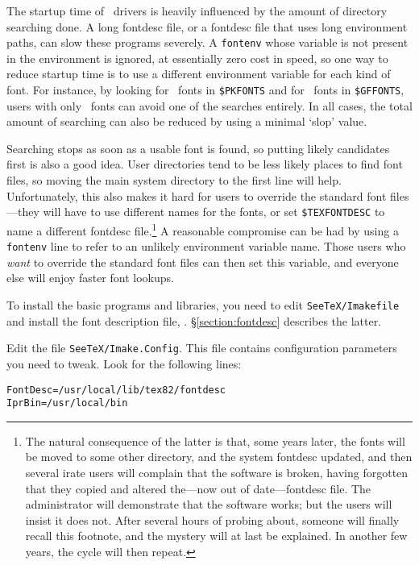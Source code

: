 The startup time of \mctex\ drivers
is heavily influenced by the amount of directory searching done.
A long fontdesc file,
or a fontdesc file that uses long environment paths,
can slow these programs severely.
A {\tt fontenv} whose variable is not present in the environment
is ignored,
at essentially zero cost in speed,
so one way to reduce startup time
is to use a different environment variable for each kind of font.
For instance,
by looking for \pk\ fonts in {\tt\$PKFONTS}
and for \gf\ fonts in {\tt\$GFFONTS},
users with only \gf\ fonts can avoid one of the searches entirely.
In all cases,
the total amount of searching
can also be reduced by using a minimal `slop' value.

Searching stops as soon as a usable font is found,
so putting likely candidates first is also a good idea.
User directories tend to be less likely places to find font files,
so moving the main system directory to the first line will help.
Unfortunately,
this also makes it hard
for users to override the standard font files---they
will have to use different names for the fonts,
or set {\tt\$TEXFONTDESC} to name a different fontdesc file.\footnote
{The natural consequence of the latter is that,
some years later,
the fonts will be moved to some other directory,
and the system fontdesc updated,
and then several irate users will complain that the software is broken,
having forgotten that they copied and altered
the---now out of date---fontdesc file.
The administrator will demonstrate that the software works;
but the users will insist it does not.
After several hours of probing about,
someone will finally recall this footnote,
and the mystery will at last be explained.
In another few years, the cycle will then repeat.}
A reasonable compromise can be had
by using a {\tt fontenv} line
to refer to an unlikely environment variable name.
Those users who {\it want\/} to override the standard font files
can then set this variable,
and everyone else will enjoy faster font lookups.


To install the basic programs and libraries, you need to edit
\verb|SeeTeX/Imakefile| and install the font description
file, {\fontdesc}. \S\ref{section:fontdesc} describes the latter.

Edit the file \verb|SeeTeX/Imake.Config|. This file contains
configuration parameters you need to tweak.
Look for the following lines:

\begin{verbatim}
FontDesc=/usr/local/lib/tex82/fontdesc
IprBin=/usr/local/bin
\end{verbatim}

